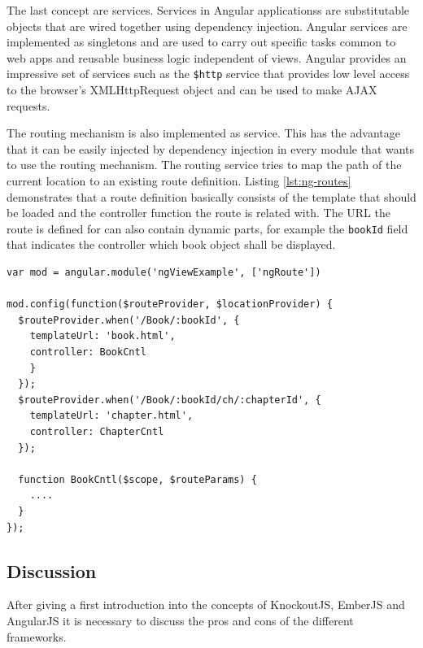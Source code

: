 The last concept are services.
Services in Angular applicationss are substitutable objects that are wired together using dependency injection. Angular services are implemented as singletons and are used to carry out specific tasks common to web apps and reusable business logic independent of views. Angular provides an impressive set of services such as the \texttt{\$http} service that provides low level access to the browser's XMLHttpRequest object and can be used to make AJAX requests.

The routing mechanism is also implemented as service. This has the advantage that it can be easily injected by dependency injection in every module that wants to use the routing mechanism. 
The routing service tries to map the path of the current location to an existing route definition. Listing \ref{lst:ng-routes} demonstrates that a route definition basically consists of the template that should be loaded and the controller function the route is related with. 
The URL the route is defined for can also contain dynamic parts, for example the \texttt{bookId} field that indicates the controller which book object shall be displayed.

\begin{lstlisting}[label=lst:ng-routes,caption=Route definition in AngularJS]
var mod = angular.module('ngViewExample', ['ngRoute'])
 
mod.config(function($routeProvider, $locationProvider) {
  $routeProvider.when('/Book/:bookId', {
    templateUrl: 'book.html',
    controller: BookCntl
    }
  });
  $routeProvider.when('/Book/:bookId/ch/:chapterId', {
    templateUrl: 'chapter.html',
    controller: ChapterCntl
  });
  
  function BookCntl($scope, $routeParams) {
	....
  }
});
\end{lstlisting}

\subsection{Discussion} \label{chap:fw-discussion}


After giving a first introduction into the concepts of KnockoutJS, EmberJS and AngularJS it is necessary to discuss the pros and cons of the different frameworks.

